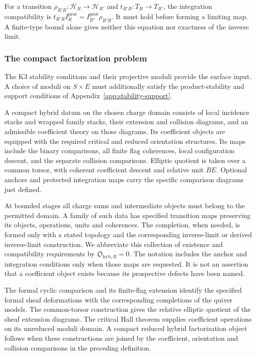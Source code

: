 For a transition $\rho_{R'R}:\mathcal H_R\to\mathcal H_{R'}$
and $t_{R'R}:T_R\to T_{R'}$, the integration compatibility is
$t_{R'R}I_R^{\mathrm{prot}}=I_{R'}^{\mathrm{prot}}\rho_{R'R}$.
It must hold before forming a limiting map. A finite-type bound
alone gives neither this equation nor exactness of the inverse
limit.

\subsubsection*{The compact factorization problem}

The K3 stability conditions and their projective moduli
\cite{BridgelandK3Stability,BayerMacriProjectivity} provide the
surface input. A choice of moduli on $S\times E$ must additionally
satisfy the product-stability and support conditions of
Appendix~\ref{app:stability-support}.

\begin{definition}
\label{def:hybrid-wrapped-factorization-datum}
A compact hybrid datum on the chosen charge domain consists of
local incidence stacks and wrapped family stacks, their extension
and collision diagrams, and an admissible coefficient theory on
those diagrams. Its coefficient objects are equipped with the
required critical and reduced orientation structures. Its maps
include the binary comparisons, all finite flag coherences,
local configuration descent, and the separate collision
comparisons. Elliptic quotient is taken over a common torsor,
with coherent coefficient descent and relative unit $BE$.
Optional anchors and protected integration maps carry the
specific comparison diagrams just defined.

At bounded stages all charge sums and intermediate objects must
belong to the permitted domain. A family of such data has
specified transition maps preserving its objects, operations,
units and coherences. The completion, when needed, is formed
only with a stated topology and the corresponding inverse-limit
or derived inverse-limit construction.
We abbreviate this collection of existence and compatibility
requirements by $\mathfrak O_{\mathrm{hyb},R}=0$. The notation
includes the anchor and integration conditions only when those
maps are requested. It is not an assertion that a coefficient
object exists because its prospective defects have been named.
\end{definition}

\begin{proposition}
\label{prop:hybrid-datum-scope}
The formal cyclic comparison and its finite-flag extension
identify the specified formal sheaf deformations with the
corresponding completions of the quiver models. The common-torsor
construction gives the relative
elliptic quotient of the sheaf extension diagrams. The critical
Hall theorem supplies coefficient operations on its unreduced
moduli domain. A compact reduced hybrid factorization object
follows when these constructions are joined by the coefficient,
orientation and collision comparisons in the preceding definition.
\end{proposition}

